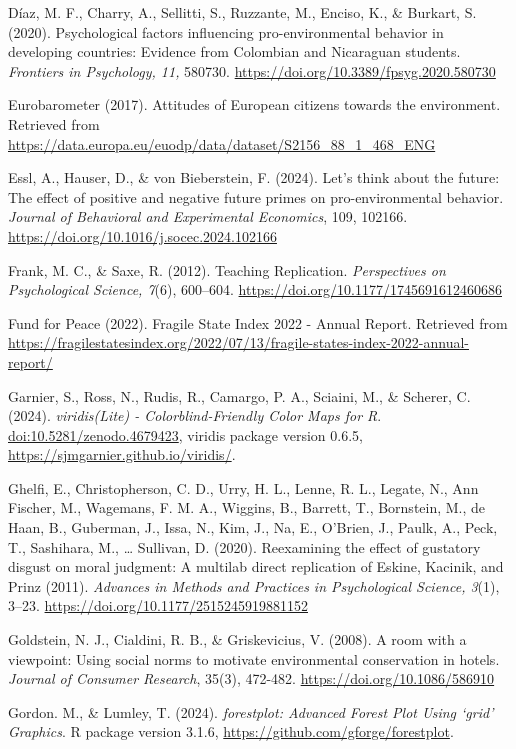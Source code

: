 \documentclass[
]{article}
\begin{document}
Díaz, M. F., Charry, A., Sellitti, S., Ruzzante, M., Enciso, K., \&
Burkart, S. (2020). Psychological factors influencing pro-environmental
behavior in developing countries: Evidence from Colombian and Nicaraguan
students. \emph{Frontiers in Psychology, 11,} 580730.
\url{https://doi.org/10.3389/fpsyg.2020.580730}

Eurobarometer (2017). Attitudes of European citizens towards the
environment. Retrieved from
\url{https://data.europa.eu/euodp/data/dataset/S2156_88_1_468_ENG}

Essl, A., Hauser, D., \& von Bieberstein, F. (2024). Let's think about
the future: The effect of positive and negative future primes on
pro-environmental behavior. \emph{Journal of Behavioral and Experimental
Economics}, 109, 102166.
\url{https://doi.org/10.1016/j.socec.2024.102166}

Frank, M. C., \& Saxe, R. (2012). Teaching Replication.
\emph{Perspectives on Psychological Science, 7}(6), 600--604.
\url{https://doi.org/10.1177/1745691612460686}

Fund for Peace (2022). Fragile State Index 2022 - Annual Report.
Retrieved from
\url{https://fragilestatesindex.org/2022/07/13/fragile-states-index-2022-annual-report/}

Garnier, S., Ross, N., Rudis, R., Camargo, P. A., Sciaini, M., \&
Scherer, C. (2024). \emph{viridis(Lite) - Colorblind-Friendly Color Maps
for R}. \url{doi:10.5281/zenodo.4679423}, viridis package version 0.6.5,
\url{https://sjmgarnier.github.io/viridis/}.

Ghelfi, E., Christopherson, C. D., Urry, H. L., Lenne, R. L., Legate,
N., Ann Fischer, M., Wagemans, F. M. A., Wiggins, B., Barrett, T.,
Bornstein, M., de Haan, B., Guberman, J., Issa, N., Kim, J., Na, E.,
O'Brien, J., Paulk, A., Peck, T., Sashihara, M., \ldots{} Sullivan, D.
(2020). Reexamining the effect of gustatory disgust on moral judgment: A
multilab direct replication of Eskine, Kacinik, and Prinz (2011).
\emph{Advances in Methods and Practices in Psychological Science, 3}(1),
3--23. \url{https://doi.org/10.1177/2515245919881152}

Goldstein, N. J., Cialdini, R. B., \& Griskevicius, V. (2008). A room
with a viewpoint: Using social norms to motivate environmental
conservation in hotels. \emph{Journal of Consumer Research}, 35(3),
472-482. \url{https://doi.org/10.1086/586910}

Gordon. M., \& Lumley, T. (2024). \emph{forestplot: Advanced Forest Plot
Using `grid' Graphics}. R package version 3.1.6,
\url{https://github.com/gforge/forestplot}.
\end{document}
